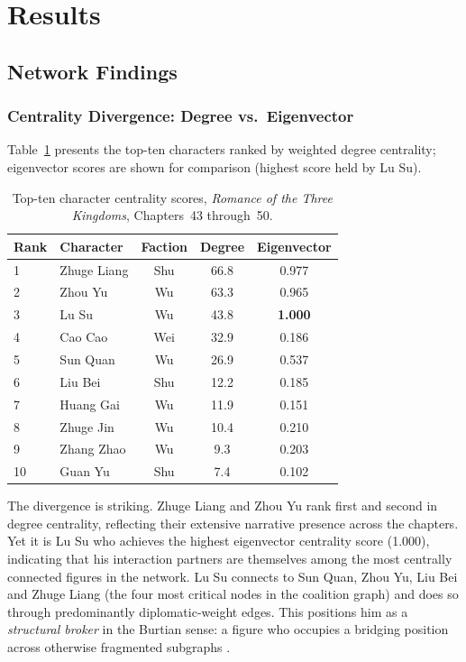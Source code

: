 \documentclass[12pt, a4paper]{article}
\newcommand{\booktitle}[1]{\textit{#1}}
\begin{document}
\section{Results}
\label{sec:results}

\subsection{Network Findings}
\label{sec:network_results}

\subsubsection{Centrality Divergence: Degree vs.\ Eigenvector}

Table~\ref{tab:centrality} presents the top-ten characters ranked by weighted
degree centrality; eigenvector scores are shown for comparison (highest score
held by Lu Su).

\begin{table}[H]
\centering
\caption{Top-ten character centrality scores,
         \booktitle{Romance of the Three Kingdoms}, Chapters~43 through~50.}
\label{tab:centrality}
\begin{tabularx}{0.82\textwidth}{l l c c c}
\toprule
\textbf{Rank} & \textbf{Character} & \textbf{Faction}
              & \textbf{Degree} & \textbf{Eigenvector} \\
\midrule
1  & Zhuge Liang & Shu     & 66.8 & 0.977 \\
2  & Zhou Yu     & Wu      & 63.3 & 0.965 \\
3  & Lu Su       & Wu      & 43.8 & \textbf{1.000} \\
4  & Cao Cao     & Wei     & 32.9 & 0.186 \\
5  & Sun Quan    & Wu      & 26.9 & 0.537 \\
6  & Liu Bei     & Shu     & 12.2 & 0.185 \\
7  & Huang Gai   & Wu      & 11.9 & 0.151 \\
8  & Zhuge Jin   & Wu      & 10.4 & 0.210 \\
9  & Zhang Zhao  & Wu      &  9.3 & 0.203 \\
10 & Guan Yu     & Shu     &  7.4 & 0.102 \\
\bottomrule
\end{tabularx}
\end{table}

The divergence is striking.
Zhuge Liang and Zhou Yu rank first and second in degree centrality,
reflecting their extensive narrative presence across the chapters.
Yet it is Lu Su who achieves the highest eigenvector centrality score (1.000),
indicating that his interaction partners are themselves among the most
centrally connected figures in the network.
Lu Su connects to Sun Quan, Zhou Yu, Liu Bei and Zhuge Liang (the four
most critical nodes in the coalition graph) and does so through
predominantly diplomatic-weight edges.
This positions him as a \emph{structural broker} in the Burtian sense:
a figure who occupies a bridging position across otherwise fragmented
subgraphs \autocite[Chapter~2]{burt2004brokerage}.
\end{document}
